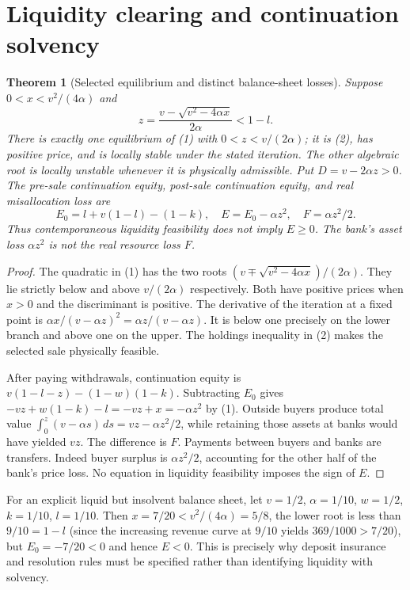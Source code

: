 \documentclass[11pt]{article}
\newtheorem{theorem}{Theorem}
\theoremstyle{remark}
\begin{document}
\section{Liquidity clearing and continuation solvency}
\begin{theorem}[Selected equilibrium and distinct balance-sheet losses]
Suppose $0<x<v^2/(4\alpha)$ and
\[
 z=\frac{v-\sqrt{v^2-4\alpha x}}{2\alpha}<1-l.
 \tag{2}
\]
There is exactly one equilibrium of (1) with $0<z<v/(2\alpha)$;
it is (2), has positive price, and is locally stable under the stated
iteration. The other algebraic root is locally unstable whenever it is
physically admissible. Put $D=v-2\alpha z>0$. The pre-sale continuation
equity, post-sale continuation equity, and real misallocation loss are
\[
 E_0=l+v(1-l)-(1-k),\quad E=E_0-\alpha z^2,\quad
 F=\alpha z^2/2. \tag{3}
\]
Thus contemporaneous liquidity feasibility does not imply $E\geq0$.
The bank's asset loss $\alpha z^2$ is not the real resource loss $F$.
\end{theorem}
\begin{proof}
The quadratic in (1) has the two roots
$(v\mp\sqrt{v^2-4\alpha x})/(2\alpha)$.
They lie strictly below and above $v/(2\alpha)$ respectively. Both have
positive prices when $x>0$ and the discriminant is positive. The derivative
of the iteration at a fixed point is
$\alpha x/(v-\alpha z)^2=\alpha z/(v-\alpha z)$.
It is below one precisely on the lower branch and above one on the upper.
The holdings inequality in (2) makes the selected sale physically feasible.

After paying withdrawals, continuation equity is
$v(1-l-z)-(1-w)(1-k)$. Subtracting $E_0$ gives
$-vz+w(1-k)-l=-vz+x=-\alpha z^2$ by (1).
Outside buyers produce total value
$\int_0^z(v-\alpha s)\,ds=vz-\alpha z^2/2$, while retaining those
assets at banks would have yielded $vz$. The difference is $F$.
Payments between buyers and banks are transfers. Indeed buyer surplus is
$\alpha z^2/2$, accounting for the other half of the bank's price loss.
No equation in liquidity feasibility imposes the sign of $E$.
\end{proof}
For an explicit liquid but insolvent balance sheet, let
$v=1/2$, $\alpha=1/10$, $w=1/2$, $k=1/10$, $l=1/10$.
Then $x=7/20<v^2/(4\alpha)=5/8$, the lower root is less than
$9/10=1-l$ (since the increasing revenue curve at $9/10$ yields
$369/1000>7/20$), but $E_0=-7/20<0$ and hence $E<0$.
This is precisely why deposit insurance and resolution rules must be
specified rather than identifying liquidity with solvency.
\end{document}
